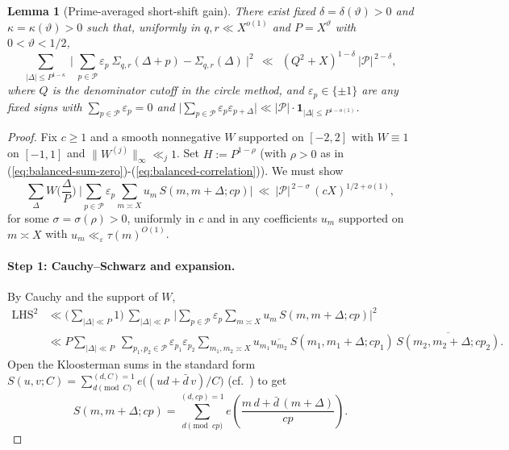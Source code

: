 \documentclass[11pt]{article}
\def\eqref#1{(\ref{#1})}%
\newtheorem{lemma}{Lemma}[part]
\theoremstyle{definition}
\theoremstyle{remark}
\numberwithin{equation}{part}
\begin{document}
\begin{lemma}[Prime-averaged short-shift gain]\label{lem:passg}
	There exist fixed $\delta=\delta(\vartheta)>0$ and $\kappa=\kappa(\vartheta)>0$ such that, uniformly in $q,r\ll X^{o(1)}$ and $P=X^\vartheta$ with $0<\vartheta<1/2$,
	\[
		\sum_{|\Delta|\le P^{1-\kappa}}\ \Big|\ \sum_{p\in\mathcal P}\varepsilon_p\ \Sigma_{q,r}(\Delta+p)-\Sigma_{q,r}(\Delta)\ \Big|^2
		\ \ \ll\ \ (Q^2+X)^{1-\delta}\ |\mathcal P|^{\,2-\delta},
	\]
	where $Q$ is the denominator cutoff in the circle method, and $\varepsilon_p\in\{\pm1\}$ are any fixed signs with $\sum_{p\in\mathcal P}\varepsilon_p=0$ and $\big|\sum_{p\in\mathcal P}\varepsilon_p\varepsilon_{p+\Delta}\big|\ll |\mathcal P|\cdot \mathbf{1}_{|\Delta|\le P^{1-o(1)}}$.
\end{lemma}


\begin{proof}
	Fix $c\ge1$ and a smooth nonnegative $W$ supported on $[-2,2]$ with $W\equiv1$ on $[-1,1]$ and $\|W^{(j)}\|_\infty\ll_j 1$.
	Set $H:=P^{1-\rho}$ (with $\rho>0$ as in \eqref{eq:balanced-sum-zero}-\eqref{eq:balanced-correlation}). We must show
	\begin{equation}\label{eq:passg-target}
		\sum_{\Delta} W\!\Big(\frac{\Delta}{P}\Big)\ \Bigg|\sum_{p\in\mathcal P}\varepsilon_p \sum_{m\asymp X} u_m\,S(m,m+\Delta;cp)\Bigg|
		\ \ll\ |\mathcal P|^{\,2-\sigma}\,(cX)^{1/2+o(1)} ,
	\end{equation}
	for some $\sigma=\sigma(\rho)>0$, uniformly in $c$ and in any coefficients $u_m$ supported on $m\asymp X$ with $u_m\ll_\varepsilon \tau(m)^{O(1)}$.

	\paragraph{Step 1: Cauchy--Schwarz and expansion.}
	By Cauchy and the support of $W$,
	\begin{align*}
		\text{LHS}^2
		 & \ll \Big(\sum_{|\Delta|\ll P}1\Big)\ \sum_{|\Delta|\ll P}\ \Bigg|\sum_{p\in\mathcal P}\varepsilon_p\sum_{m\asymp X} u_m\,S(m,m+\Delta;cp)\Bigg|^2 \\
		 & \ll P \sum_{|\Delta|\ll P}\ \sum_{p_1,p_2\in\mathcal P}\varepsilon_{p_1}\varepsilon_{p_2}
		\sum_{m_1,m_2\asymp X} u_{m_1}\overline{u_{m_2}}\ S(m_1,m_1+\Delta;cp_1)\,\overline{S(m_2,m_2+\Delta;cp_2)} .
	\end{align*}
	Open the Kloosterman sums in the standard form $S(u,v;C)=\sum_{d\!\!\pmod C}^{(d,C)=1} e\!\big((ud+\bar d\,v)/C\big)$ (cf.~\cite[Ch.~11, \S11.10]{IK}) to get
	\[
		S(m,m+\Delta;cp)=\sum_{d\!\!\pmod{cp}}^{(d,cp)=1} e\!\left(\frac{m\,d+\bar d\,(m+\Delta)}{cp}\right).
	\]


\end{proof}
\end{document}

